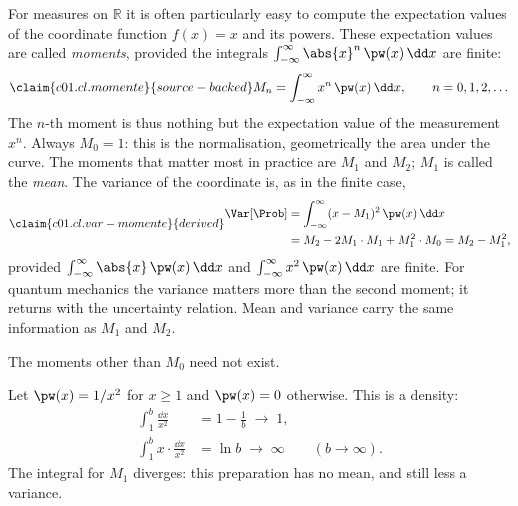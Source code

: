 For measures on $\mathbb{R}$ it is often particularly easy to compute the expectation values
of the coordinate function $f(x) = x$ and its powers. These expectation values are called
\emph{moments}, provided the integrals
$\int_{-\infty}^{\infty} \abs{x}^n\,\pw(x)\,\dd x$ are finite:
\begin{equation}\label{c01.eq.momente}\claim{c01.cl.momente}{source-backed}
  M_n = \int_{-\infty}^{\infty} x^n\, \pw(x)\,\dd x ,
  \qquad n = 0, 1, 2, \dots
\end{equation}
The $n$-th moment is thus nothing but the expectation value of the measurement $x^n$.
Always $M_0 = 1$: this is the normalisation, geometrically the area under the curve. The
moments that matter most in practice are $M_1$ and $M_2$; $M_1$ is called the
\emph{mean}. The variance of the coordinate is, as in the finite case,
\begin{equation}\label{c01.eq.var-momente}\claim{c01.cl.var-momente}{derived}
  \begin{aligned}
    \Var[\Prob] &= \int_{-\infty}^{\infty} (x - M_1)^2\, \pw(x)\,\dd x \\
    &= M_2 - 2 M_1\cdot M_1 + M_1^2\cdot M_0 = M_2 - M_1^2 ,
  \end{aligned}
\end{equation}
provided $\int_{-\infty}^{\infty} \abs{x}\,\pw(x)\,\dd x$ and
$\int_{-\infty}^{\infty} x^2\,\pw(x)\,\dd x$ are finite. For quantum mechanics the variance matters more than
the second moment; it returns with the uncertainty relation. Mean and variance
carry the same information as $M_1$ and $M_2$.

The moments other than $M_0$ need not exist.

\begin{example}\label{c01.ex.kein-mittelwert}
  Let $\pw(x) = 1/x^2$ for $x \geq 1$ and $\pw(x) = 0$ otherwise. This is a density:
  \begin{equation}\label{c01.eq.kein-mittelwert}
    \begin{aligned}
      \int_1^{b} \frac{\dd x}{x^2} &= 1 - \frac{1}{b} \;\longrightarrow\; 1, \\
      \int_1^{b} x\cdot\frac{\dd x}{x^2} &= \ln b \;\longrightarrow\; \infty
      \qquad (b \to \infty) .
    \end{aligned}
  \end{equation}
  The integral for $M_1$ diverges: this preparation has no mean, and still less a
  variance.
\end{example}

